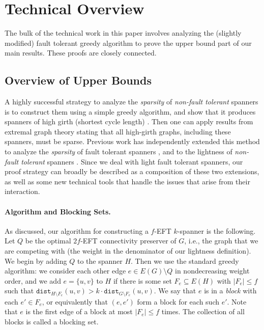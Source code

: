 \documentclass{article}
\theoremstyle{plain}
\theoremstyle{definition}
\newcommand{\dist}{\texttt{dist}}
\begin{document}
\section{Technical Overview}  \label{sec:technical-overview}
The bulk of the technical work in this paper involves analyzing the (slightly modified) fault tolerant greedy algorithm to prove the upper bound part of our main results.
These proofs are closely connected.

\subsection{Overview of Upper Bounds}\label{overview}

A highly successful strategy to analyze the \emph{sparsity} of \emph{non-fault tolerant} spanners is to construct them using a simple greedy algorithm, and show that it produces spanners of high girth (shortest cycle length) \cite{ADDJS93}.
Then one can apply results from extremal graph theory stating that all high-girth graphs, including these spanners, must be sparse.
Previous work has independently extended this method to analyze the \emph{sparsity} of fault tolerant spanners \cite{BDPV18, BP19, BDR22}, and to the lightness of \emph{non-fault tolerant} spanners \cite{ENS14}.
Since we deal with light fault tolerant spanners, our proof strategy can broadly be described as a composition of these two extensions, as well as some new technical tools that handle the issues that arise from their interaction.

\paragraph{Algorithm and Blocking Sets.}

As discussed, our algorithm for constructing a $f$-EFT $k$-spanner is the following.  Let $Q$ be the optimal $2f$-EFT connectivity preserver of $G$, i.e., the graph that we are competing with (the weight in the denominator of our lightness definition).
We begin by adding $Q$ to the spanner $H$.  Then we use the standard greedy algorithm: we consider each other edge $e \in E(G) \setminus Q$ in nondecreasing weight order, and we add $e = \{u,v\}$ to $H$ if there is some set $F_e \subseteq E(H)$ with $|F_e| \leq f$ such that $\dist_{H \setminus F_e}(u,v) > k \cdot \dist_{G \setminus F_e}(u,v)$.  We say that $e$ is in a \emph{block} with each $e' \in F_e$, or equivalently that $(e, e')$ form a block for each such $e'$.  Note that $e$ is the first edge of a block at most $|F_e| \leq f$ times.  The collection of all blocks is called a blocking set.
  
\end{document}
